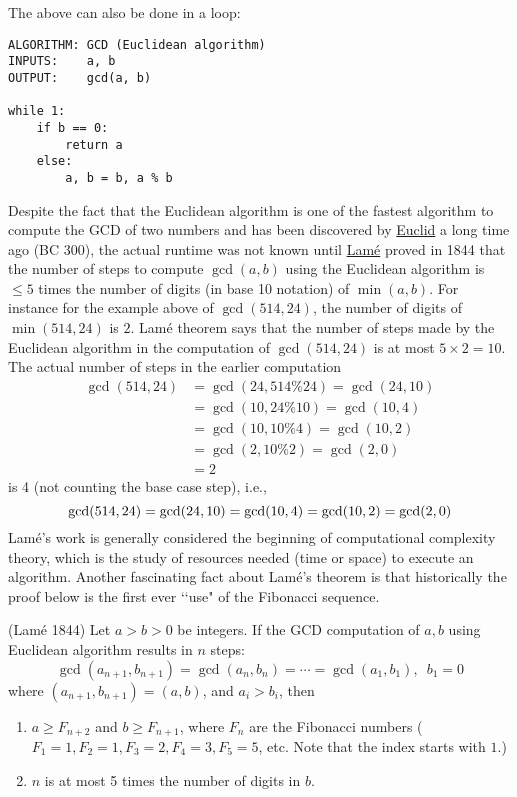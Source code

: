 The above can also be done in a loop:
\begin{Verbatim}[frame=single,fontsize=\footnotesize]
ALGORITHM: GCD (Euclidean algorithm)
INPUTS:    a, b
OUTPUT:    gcd(a, b)

while 1:
    if b == 0: 
        return a
    else:
        a, b = b, a % b
\end{Verbatim}




Despite the fact that the Euclidean algorithm is one of the fastest
algorithm to compute the GCD of two numbers and has been discovered
by
\href{https://en.wikipedia.org/wiki/Euclid}{Euclid} a long time ago (BC 300),
the actual runtime was not known until
\href{https://en.wikipedia.org/wiki/Gabriel_Lam%C3%A9}{Lam\'e}
proved in 1844 that the number of steps to compute
$\gcd(a, b)$ using the Euclidean algorithm
is $\leq 5$ times the number of digits (in base 10 notation)
of $\min(a, b)$.
For instance for the example above
of $\gcd(514, 24)$, the number of digits of $\min(514,24)$ is $2$.
Lam\'e theorem says that the number of steps made by the
Euclidean algorithm in the computation of $\gcd(514, 24)$ is
at most $5 \times 2 = 10$.
The actual number of steps in the earlier computation
\begin{align*}
  \gcd(514, 24)
  &= \gcd(24, 514 \% 24) = \gcd(24, 10) \\
  &= \gcd(10, 24 \% 10) = \gcd(10, 4) \\
  &= \gcd(10, 10 \% 4) = \gcd(10, 2) \\
  &= \gcd(2, 10 \% 2) = \gcd(2, 0) \\
  &= 2
\end{align*}
is 4 (not counting the base case step), i.e.,
\[
  \gcd(514, 24)
 = \gcd(24, 10) \\
 = \gcd(10, 4) \\
 = \gcd(10, 2) \\
 = \gcd(2, 0) \\
\]
Lam\'e's work is generally considered the beginning of
computational complexity theory, which is the study of
resources needed (time or space) to execute an algorithm.
Another fascinating fact about Lam\'e's theorem is that historically
the proof below is the first ever \lq\lq use" of the Fibonacci sequence.

\begin{thm} \textnormal{(Lam\'e 1844)}
  Let $a > b > 0$ be integers.
  If the GCD computation of $a,b$ 
  using Euclidean algorithm results in $n$ steps:
  \[
  \gcd(a_{n+1}, b_{n+1})
  = \gcd(a_{n}, b_{n})
  = \cdots
  = \gcd(a_1, b_1), \,\,\, b_1 = 0
  \]
  where $(a_{n+1}, b_{n+1}) = (a, b)$, and $a_i > b_i$, then
  \begin{enumerate}[nosep,label=\textnormal{(\alph*)}]
  \item  $a \geq F_{n+2}$ and
    $b \geq F_{n+1}$, where $F_n$ are the Fibonacci numbers
    ($F_1 = 1, F_2 = 1, F_3 = 2, F_4 = 3, F_5 = 5$, etc.
    Note that the index starts with $1$.)
  \item $n$ is at most 5 times the number of digits in $b$.
  \end{enumerate}
\end{thm}
\proof



